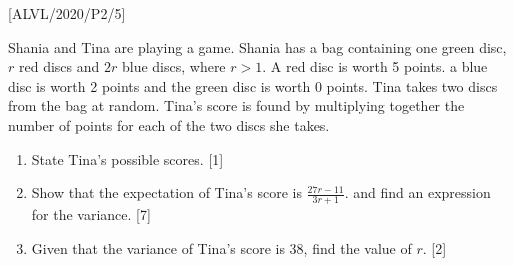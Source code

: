 \item {[}ALVL/2020/P2/5{]}

Shania and Tina are playing a game. Shania has a bag containing one
green disc, $r$ red discs and $2r$ blue discs, where $r>1$. A red
disc is worth 5 points. a blue disc is worth 2 points and the green
disc is worth 0 points. Tina takes two discs from the bag at random.
Tina's score is found by multiplying together the number of points
for each of the two discs she takes. 
\begin{enumerate}
\item State Tina\textquoteright s possible scores. \hfill{}{[}1{]}
\item Show that the expectation of Tina's score is $\frac{27r-11}{3r+1}$.
and find an expression for the variance.\hfill{} {[}7{]}
\item Given that the variance of Tina's score is 38, find the value of $r$.
\hfill{}{[}2{]}
\end{enumerate}
